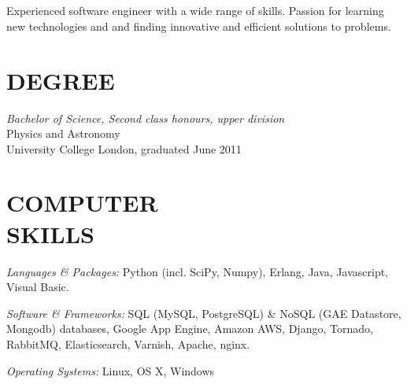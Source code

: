 \documentclass[margin, 10pt]{res} %
\begin{document}
\begin{resume}

 
\section{}

Experienced software engineer with a wide range of skills. Passion for learning new technologies and and finding innovative and efficient solutions to problems.


\section{DEGREE}

{\sl Bachelor of Science, Second class honours, upper division} \\
Physics and Astronomy \\
University College London, graduated June 2011
 

\section{COMPUTER \\ SKILLS} 

{\sl Languages \& Packages:} 
Python (incl. SciPy, Numpy), Erlang, Java, Javascript, Visual Basic.

{\sl Software \& Frameworks:} 
SQL (MySQL, PostgreSQL) \& NoSQL (GAE Datastore, Mongodb) databases, Google App Engine, Amazon AWS, Django, Tornado, RabbitMQ, Elasticsearch, Varnish, Apache, nginx.

{\sl Operating Systems:} Linux, OS X, Windows
 
 

\end{resume}
\end{document}
